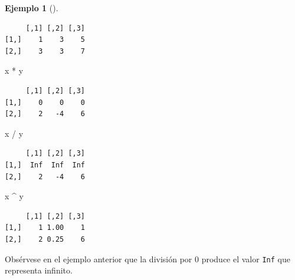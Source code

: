 \documentclass[
  spanish,
  a4paper,
]{scrreport}
\newenvironment{Shaded}{\begin{snugshade}}{\end{snugshade}}
\newcommand{\NormalTok}[1]{\textcolor[rgb]{0.00,0.23,0.31}{#1}}
\newcommand{\SpecialCharTok}[1]{\textcolor[rgb]{0.37,0.37,0.37}{#1}}
\theoremstyle{definition}
\theoremstyle{definition}
\newtheorem{example}{Ejemplo}[chapter]
\theoremstyle{remark}
\begin{document}
\begin{example}[]
\begin{verbatim}
     [,1] [,2] [,3]
[1,]    1    3    5
[2,]    3    3    7
\end{verbatim}

\begin{Shaded}
\begin{Highlighting}[]
\NormalTok{x }\SpecialCharTok{*}\NormalTok{ y}
\end{Highlighting}
\end{Shaded}

\begin{verbatim}
     [,1] [,2] [,3]
[1,]    0    0    0
[2,]    2   -4    6
\end{verbatim}

\begin{Shaded}
\begin{Highlighting}[]
\NormalTok{x }\SpecialCharTok{/}\NormalTok{ y}
\end{Highlighting}
\end{Shaded}

\begin{verbatim}
     [,1] [,2] [,3]
[1,]  Inf  Inf  Inf
[2,]    2   -4    6
\end{verbatim}

\begin{Shaded}
\begin{Highlighting}[]
\NormalTok{x }\SpecialCharTok{\^{}}\NormalTok{ y}
\end{Highlighting}
\end{Shaded}

\begin{verbatim}
     [,1] [,2] [,3]
[1,]    1 1.00    1
[2,]    2 0.25    6
\end{verbatim}

\end{example}

\begin{tcolorbox}[enhanced jigsaw, arc=.35mm, bottomrule=.15mm, bottomtitle=1mm, breakable, colback=white, colbacktitle=quarto-callout-warning-color!10!white, colframe=quarto-callout-warning-color-frame, coltitle=black, left=2mm, leftrule=.75mm, opacityback=0, opacitybacktitle=0.6, rightrule=.15mm, title=\textcolor{quarto-callout-warning-color}{\faExclamationTriangle}\hspace{0.5em}{Advertencia}, titlerule=0mm, toprule=.15mm, toptitle=1mm]

Obsérvese en el ejemplo anterior que la división por 0 produce el valor
\texttt{Inf} que representa infinito.

\end{tcolorbox}
\end{document}
